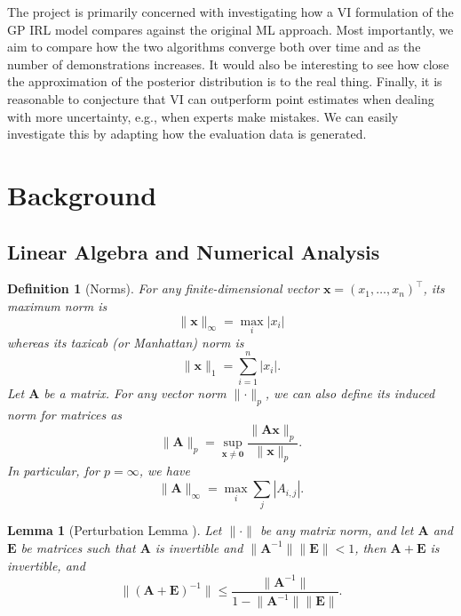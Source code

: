\documentclass{mpaper}
\newtheorem{lemma}[theorem]{Lemma}
\newtheorem{definition}[theorem]{Definition}
\begin{document}
The project is primarily concerned with investigating how a VI formulation of
the GP IRL model compares against the original ML approach. Most importantly, we
aim to compare how the two algorithms converge both over time and as the number
of demonstrations increases. It would also be interesting to see how close the
approximation of the posterior distribution is to the real thing. Finally, it is
reasonable to conjecture that VI can outperform point estimates when dealing
with more uncertainty, e.g., when experts make mistakes. We can easily
investigate this by adapting how the evaluation data is generated.

\section{Background} \label{sec:background}

\subsection{Linear Algebra and Numerical Analysis}

\begin{definition}[Norms]
  For any finite-dimensional vector $\mathbf{x} = (x_1, \dots, x_n)^\intercal$,
  its \emph{maximum norm} is
  \[
    \lVert \mathbf{x} \rVert_\infty = \max_i |x_i|
  \]
  whereas its \emph{taxicab} (or \emph{Manhattan}) \emph{norm} is
  \[
    \lVert \mathbf{x} \rVert_1 = \sum_{i = 1}^n |x_i|.
  \]
  Let $\mathbf{A}$ be a matrix. For any vector norm $\lVert
  \cdot \rVert_p$, we can also define its \emph{induced norm} for matrices as
  \[
    \lVert \mathbf{A} \rVert_p = \sup_{\mathbf{x} \ne \mathbf{0}} \frac{\lVert
      \mathbf{Ax} \rVert_p}{\lVert \mathbf{x} \rVert_p}.
  \]
  In particular, for $p = \infty$, we have
  \[
    \lVert \mathbf{A} \rVert_\infty = \max_i \sum_{j} |A_{i,j}|.
  \]
\end{definition}

\begin{lemma}[Perturbation Lemma
  \cite{layton2014numerical}] \label{prop:condition_number}
  Let $\lVert \cdot \rVert$ be any matrix norm, and let $\mathbf{A}$ and
  $\mathbf{E}$ be matrices such that $\mathbf{A}$ is invertible and $\lVert
  \mathbf{A}^{-1} \rVert \lVert \mathbf{E} \rVert < 1$, then $\mathbf{A} +
  \mathbf{E}$ is invertible, and
  \[
    \lVert (\mathbf{A} + \mathbf{E})^{-1} \rVert \le \frac{\lVert
      \mathbf{A}^{-1} \rVert}{1 - \lVert \mathbf{A}^{-1} \rVert \lVert
      \mathbf{E} \rVert}.
  \]
\end{lemma}
\end{document}
